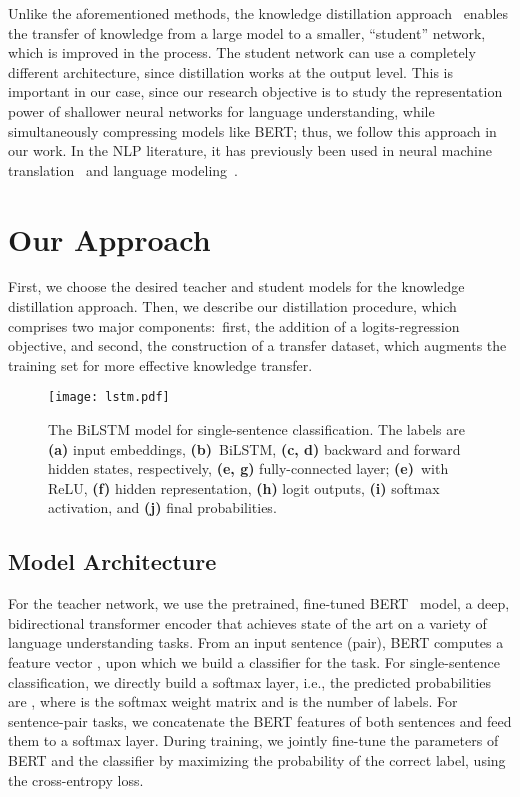 \documentclass[11pt,a4paper]{article}
\newcommand\caplbl[1]{\textbf{(#1)}}
\begin{document}
Unlike the aforementioned methods, the knowledge distillation approach~\cite{ba2014deep,hinton2015distilling} enables the transfer of knowledge from a large model to a smaller, ``student'' network, which is improved in the process.
The student network can use a completely different architecture, since distillation works at the output level.
This is important in our case, since our research objective is to study the representation power of shallower neural networks for language understanding, while simultaneously compressing models like BERT; thus, we follow this approach in our work.
In the NLP literature, it has previously been used in neural machine translation~\cite{kim2016sequence} and language modeling~\cite{yu2018device}.






\section{Our Approach}

First, we choose the desired teacher and student models for the knowledge distillation approach. Then, we describe our distillation procedure, which comprises two major components:~first, the addition of a logits-regression objective, and second, the construction of a transfer dataset, which augments the training set for more effective knowledge transfer.

\begin{figure}
    \centering
    \texttt{[image: lstm.pdf]}
    \caption{The BiLSTM model for single-sentence classification. The labels are \caplbl{a} input embeddings, \caplbl{b}~BiLSTM, \caplbl{c, d} backward and forward hidden states, respectively, \caplbl{e, g} fully-connected layer; \caplbl{e}~with ReLU, \caplbl{f} hidden representation, \caplbl{h} logit outputs, \caplbl{i} softmax activation, and \caplbl{j} final probabilities.}
    \label{fig:bilstm}
\end{figure}
\subsection{Model Architecture}
For the teacher network, we use the pretrained, fine-tuned BERT~\cite{devlin2018bert} model, a deep, bidirectional transformer encoder that achieves state of the art on a variety of language understanding tasks. 
From an input sentence (pair), BERT computes a feature vector , upon which we build a classifier for the task. For single-sentence classification, we directly build a softmax layer, i.e., the predicted probabilities are , where  is the softmax weight matrix and  is the number of labels. For sentence-pair tasks, we concatenate the BERT features of both sentences and feed them to a softmax layer. During training, we jointly fine-tune the parameters of BERT and the classifier by maximizing the probability of the correct label, using the cross-entropy loss.
\end{document}
